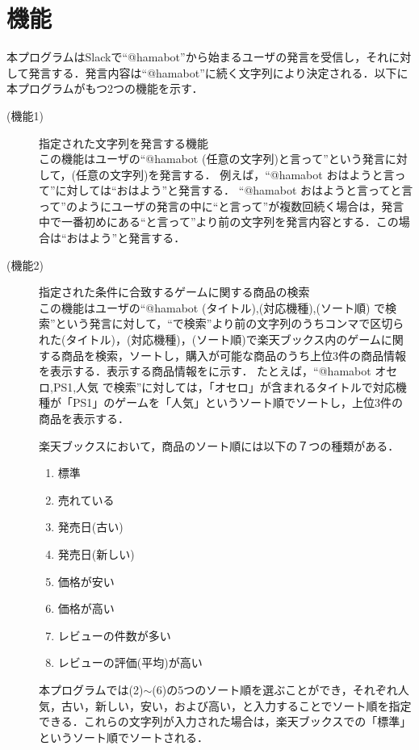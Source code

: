 \documentclass[12pt]{jsarticle}
\begin{document}
\section{機能}
本プログラムはSlackで``@hamabot''から始まるユーザの発言を受信し，それに対して発言する．発言内容は``@hamabot''に続く文字列により決定される．以下に本プログラムがもつ2つの機能を示す．
\begin{description}
  \item[(機能1)] 指定された文字列を発言する機能\\
  この機能はユーザの``@hamabot (任意の文字列)と言って''という発言に対して，(任意の文字列)を発言する．
  例えば，``@hamabot おはようと言って''に対しては``おはよう''と発言する．
  ``@hamabot おはようと言ってと言って''のようにユーザの発言の中に``と言って''が複数回続く場合は，発言中で一番初めにある``と言って''より前の文字列を発言内容とする．この場合は``おはよう''と発言する．
  \item[(機能2)] 指定された条件に合致するゲームに関する商品の検索\\
  この機能はユーザの``@hamabot (タイトル),(対応機種),(ソート順) で検索''という発言に対して，``で検索''より前の文字列のうちコンマで区切られた(タイトル)，(対応機種)，(ソート順)で楽天ブックス内のゲームに関する商品を検索，ソートし，購入が可能な商品のうち上位3件の商品情報を表示する．表示する商品情報をに示す．
  たとえば，``@hamabot オセロ,PS1,人気 で検索''に対しては，「オセロ」が含まれるタイトルで対応機種が「PS1」のゲームを「人気」というソート順でソートし，上位3件の商品を表示する．

楽天ブックスにおいて，商品のソート順には以下の７つの種類がある．
\begin{enumerate}
  \item 標準
  \item 売れている
  \item 発売日(古い)
  \item 発売日(新しい)
  \item 価格が安い
  \item 価格が高い
  \item レビューの件数が多い
  \item レビューの評価(平均)が高い
\end{enumerate}
本プログラムでは(2)$\sim$(6)の5つのソート順を選ぶことができ，それぞれ人気，古い，新しい，安い，および高い，と入力することでソート順を指定できる．これらの文字列が入力された場合は，楽天ブックスでの「標準」というソート順でソートされる．



\end{description}
\end{document}

